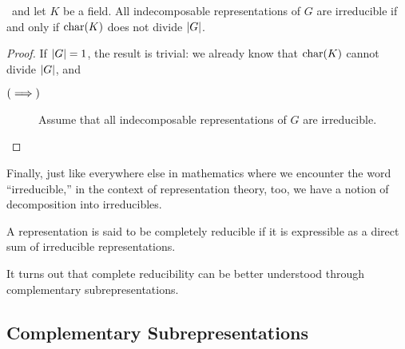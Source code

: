 \begin{proposition}
    \ and let $K$ be a field. All indecomposable representations of $G$ are irreducible if and only if $\operatorname{char}\!\left( K \right)$ does not divide $\left\lvert G \right\rvert$.
\end{proposition}
\begin{proof}
    If $\left\lvert G \right\rvert = 1$, the result is trivial: we already know that $\operatorname{char}\!\left( K \right)$ cannot divide $\left\lvert G \right\rvert$, and 
    \begin{description}
        \item[$\left( \implies \right)$] Assume that all indecomposable representations of $G$ are irreducible. 
    \end{description}
\end{proof}

Finally, just like everywhere else in mathematics where we encounter the word ``irreducible,'' in the context of representation theory, too, we have a notion of decomposition into irreducibles.

\begin{boxdefinition} \label{Ch1:Def:Comp_Red}
    A representation is said to be completely reducible if it is expressible as a direct sum of irreducible representations.
\end{boxdefinition}

It turns out that complete reducibility can be better understood through complementary subrepresentations.

\subsection{Complementary Subrepresentations}

